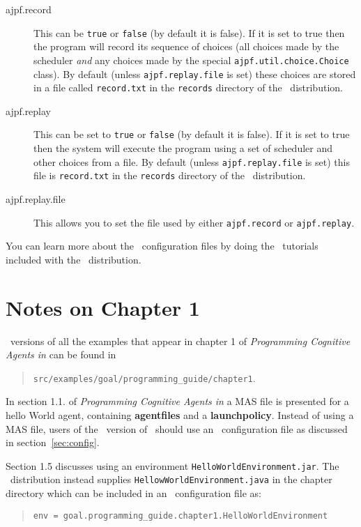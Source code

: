 \documentclass[a4]{article}
\begin{document}
\begin{description}
\item[ajpf.record] This can be \texttt{true} or \texttt{false} (by default  it is false).  If it is set to true then the program will record its sequence of choices (all choices made by the scheduler \emph{and} any choices made by the special \texttt{ajpf.util.choice.Choice} class).  By default (unless \texttt{ajpf.replay.file} is set) these choices are stored in a file called \texttt{record.txt} in the \texttt{records} directory of the \mcapl\ distribution.
\item[ajpf.replay] This can be set to \texttt{true} or \texttt{false} (by default it is false).  If it is set to true then the system will execute the program using a set of scheduler and other choices from a file.  By default (unless \texttt{ajpf.replay.file} is set) this  file is  \texttt{record.txt} in the \texttt{records} directory of the \mcapl\ distribution.
\item[ajpf.replay.file] This allows you to set the file used by either \texttt{ajpf.record} or \texttt{ajpf.replay}.
\end{description}

You can learn more about the \ail\ configuration files by doing the \ail\ tutorials included with the \mcapl\ distribution.

\section{Notes on Chapter 1}

\ail\ versions of all the examples that appear in chapter 1 of \emph{Programming Cognitive Agents in \goal} can be found in
\begin{quote}
  \texttt{src/examples/goal/programming\_guide/chapter1}.
\end{quote}

In section 1.1. of \emph{Programming Cognitive Agents in \goal} a MAS file is presented for a hello World agent, containing {\bf agentfiles} and a {\bf launchpolicy}.  Instead of using a MAS file, users of the \ail\ version of \goal\ should use an \ail\ configuration file as discussed in section~\ref{sec:config}.

Section 1.5 discusses using an environment \texttt{HelloWorldEnvironment.jar}.  The \mcapl\ distribution instead supplies \texttt{HellowWorldEnvironment.java} in the chapter directory which can be included in an \ail\ configuration file as:

\begin{quote}
  \texttt{env = goal.programming_guide.chapter1.HelloWorldEnvironment}
\end{quote}
\end{document}

